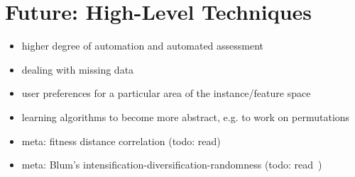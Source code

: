 \documentclass{article}
\begin{document}
\section{Future: High-Level Techniques}\label{sec:future}
\begin{itemize}
	\item higher degree of automation and automated assessment
	\item dealing with missing data
	\item user preferences for a particular area of the instance/feature space
	\item learning algorithms to become more abstract, e.g. to work on permutations
	\item meta: fitness distance correlation (todo: read)
	\item meta: Blum's intensification-diversification-randomness (todo: read~\cite{Blum:2003:MCO:937503.937505})
\end{itemize}



\end{document}
